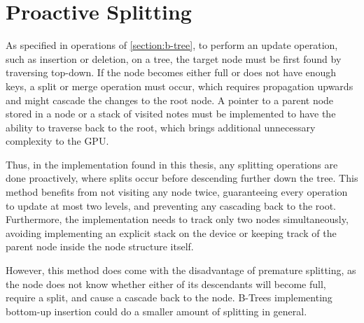\section{Proactive Splitting}

As specified in operations of \cref{section:b-tree}, to perform an update operation, such as insertion or deletion, on a tree, the target node must be first found by traversing top-down. If the node becomes either full or does not have enough keys, a split or merge operation must occur, which requires propagation upwards and might cascade the changes to the root node. A pointer to a parent node stored in a node or a stack of visited notes must be implemented to have the ability to traverse back to the root, which brings additional unnecessary complexity to the GPU.

Thus, in the implementation found in this thesis, any splitting operations are done proactively, where splits occur before descending further down the tree. This method benefits from not visiting any node twice, guaranteeing every operation to update at most two levels, and preventing any cascading back to the root. Furthermore, the implementation needs to track only two nodes simultaneously, avoiding implementing an explicit stack on the device or keeping track of the parent node inside the node structure itself.

However, this method does come with the disadvantage of premature splitting, as the node does not know whether either of its descendants will become full, require a split, and cause a cascade back to the node. B-Trees implementing bottom-up insertion could do a smaller amount of splitting in general.
